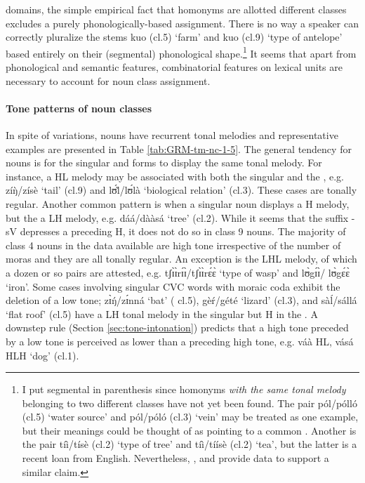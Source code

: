 \begin{exe}
\begin{exe}
\begin{exe}
\begin{exe}
\begin{exe}
\begin{exe}
domains, the simple empirical fact that homonyms are allotted different classes  excludes a purely phonologically-based  assignment. There is no way a speaker can correctly pluralize the stems {\sls kuo} ({\sc cl.5})  `farm' and   {\sls kuo} ({\sc cl.9})  `type of antelope' based entirely on their (segmental) phonological shape.\footnote{I put segmental in parenthesis since  homonyms {\it with the same tonal melody} belonging to two different classes have not yet been  found. The pair {\sls pól}/{\sls pólló} ({\sc cl.5}) `water source' and {\sls pól}/{\sls póló} ({\sc cl.3}) `vein' may be treated as one example,  but their meanings could be thought of as pointing to a common .  Another is the pair  {\sls  tíì}/{\sls  tísè} ({\sc cl.2}) `type of tree' and {\sls  tíì}/{\sls  tíísè} ({\sc cl.2}) `tea', but the latter is a recent loan from English. Nevertheless, \citet{Bonv88}, \citet{Awed07} and \citet{Tcha07} provide data to support a similar claim.} It seems that apart from phonological and semantic features, combinatorial features on lexical units are necessary to account for noun class assignment.


\paragraph{Tone patterns of noun classes}
\label{sec:GRM-tone-p}


In
spite of variations,  nouns have recurrent tonal
melodies and representative examples are presented in
Table \ref{tab:GRM-tm-nc-1-5}.  The  general tendency for nouns is for 
the singular and   forms to display the same tonal melody.  For
instance, a HL melody may be associated with both the singular and the ,
e.g.  {\sls zíŋ̀}/{\sls zísè} `tail' ({\sc cl.9}) 
and   {\sls lʊ́l̀}/{\sls lʊ́là} `biological relation'  ({\sc cl.3}). These 
cases 
are tonally regular. 
Another common pattern is when a singular noun displays a H melody, but the
 a LH melody, e.g.  {\sls dáá}/{\sls dààsá} `tree' ({\sc cl.2}). 
While 
it
 seems that  the
 suffix -{\sls sV}  depresses a preceding H,  it does not do so in class 9 nouns. The 
majority 
of class 4 nouns in the data available are high tone irrespective of the number of moras and they 
are all tonally regular.  An exception is the LHL melody, of which a dozen or so pairs are 
attested, e.g.  {\sls tʃɪ̀ɪ̀rɪ́ɪ̀}/{\sls  tʃɪ̀ɪ̀rɛ́ɛ̀} `type of wasp' and  {\sls  lʊ̀gɪ́ɪ̀}/{\sls  
lʊ̀gɛ́ɛ̀} `iron'. Some cases involving
singular CVC words with moraic
coda exhibit the deletion of a low tone;  {\sls zɪ̀ŋ́}/{\sls zɪ́nná} `bat' 
({\sc 
cl.5}),   {\sls gèŕ}/{\sls gété} `lizard' ({\sc cl.3}),  and
{\sls sàĺ}/{\sls sállá} `flat roof' ({\sc cl.5})  have a LH tonal melody in 
the
singular but  H in the . A downstep rule (Section
\ref{sec:tone-intonation})  predicts that a high tone preceded by a low tone is
perceived as lower than a preceding high
tone, e.g. {\sls váà}  {HL},  {\sls vá{\ꜜ}sá}  {HLH}  `dog' 
({\sc cl.1}).  


\end{exe}
\end{exe}
\end{exe}
\end{exe}
\end{exe}
\end{exe}
